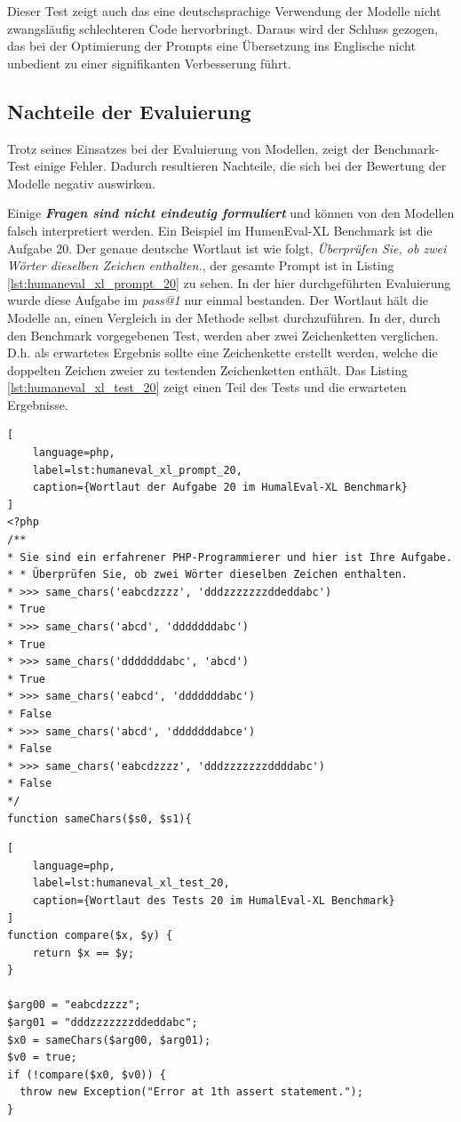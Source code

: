 Dieser Test zeigt auch das eine deutschsprachige Verwendung der Modelle nicht zwangsläufig schlechteren Code hervorbringt. Daraus wird der Schluss gezogen, das bei der Optimierung der Prompts eine Übersetzung ins Englische nicht unbedient zu einer signifikanten Verbesserung führt.

\subsection{Nachteile der Evaluierung}\label{subsec:disadvantages_of_evaluation}
Trotz seines Einsatzes bei der Evaluierung von Modellen, zeigt der Benchmark-Test einige Fehler. Dadurch resultieren Nachteile, die sich bei der Bewertung der Modelle negativ auswirken.\vspace{0.2cm}

Einige \textit{\textbf{Fragen sind nicht eindeutig formuliert}} und können von den Modellen falsch interpretiert werden. Ein Beispiel im HumenEval-XL Benchmark ist die Aufgabe 20. Der genaue deutsche Wortlaut ist wie folgt, \textit{Überprüfen Sie, ob zwei Wörter dieselben Zeichen enthalten.}, der gesamte Prompt ist in Listing \ref{lst:humaneval_xl_prompt_20} zu sehen. In der hier durchgeführten Evaluierung wurde diese Aufgabe im \textit{pass@1} nur einmal bestanden. Der Wortlaut hält die Modelle an, einen Vergleich in der Methode selbst durchzuführen. In der, durch den Benchmark vorgegebenen Test, werden aber zwei Zeichenketten verglichen. D.h. als erwartetes Ergebnis sollte eine Zeichenkette erstellt werden, welche die doppelten Zeichen zweier zu testenden Zeichenketten enthält. Das Listing \ref{lst:humaneval_xl_test_20} zeigt einen Teil des Tests und die erwarteten Ergebnisse.\vspace{0.2cm}

\begin{lstlisting}[
	language=php,
	label=lst:humaneval_xl_prompt_20,
	caption={Wortlaut der Aufgabe 20 im HumalEval-XL Benchmark}
]
<?php
/**
* Sie sind ein erfahrener PHP-Programmierer und hier ist Ihre Aufgabe.
* * Überprüfen Sie, ob zwei Wörter dieselben Zeichen enthalten.
* >>> same_chars('eabcdzzzz', 'dddzzzzzzzddeddabc')
* True
* >>> same_chars('abcd', 'dddddddabc')
* True
* >>> same_chars('dddddddabc', 'abcd')
* True
* >>> same_chars('eabcd', 'dddddddabc')
* False
* >>> same_chars('abcd', 'dddddddabce')
* False
* >>> same_chars('eabcdzzzz', 'dddzzzzzzzddddabc')
* False
*/
function sameChars($s0, $s1){
\end{lstlisting}

\begin{lstlisting}[
	language=php,
	label=lst:humaneval_xl_test_20,
	caption={Wortlaut des Tests 20 im HumalEval-XL Benchmark}
]
function compare($x, $y) {
	return $x == $y;
}

$arg00 = "eabcdzzzz";
$arg01 = "dddzzzzzzzddeddabc";
$x0 = sameChars($arg00, $arg01);
$v0 = true;
if (!compare($x0, $v0)) {
  throw new Exception("Error at 1th assert statement.");
}
\end{lstlisting}

